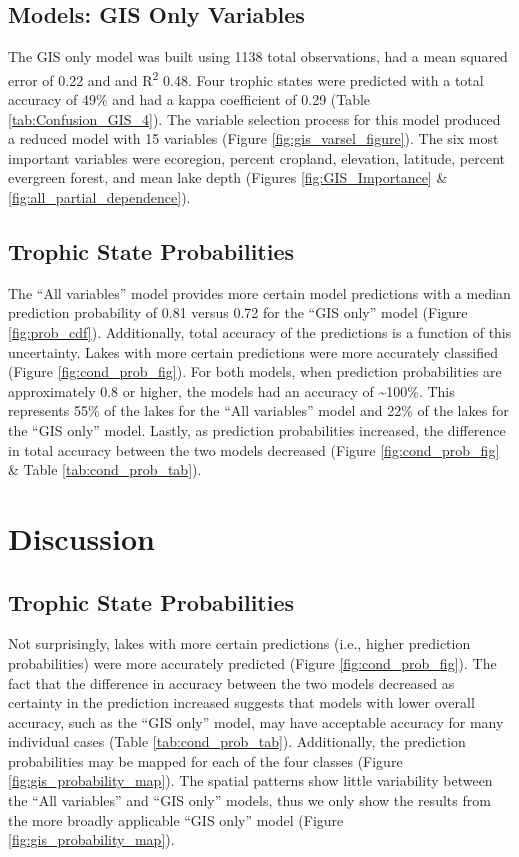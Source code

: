 \documentclass[12pt,]{article}
\begin{document}
\subsection{Models: GIS Only Variables}\label{models-gis-only-variables}

The GIS only model was built using 1138 total observations, had a mean
squared error of 0.22 and and R\textsuperscript{2} 0.48. Four trophic
states were predicted with a total accuracy of 49\% and had a kappa
coefficient of 0.29 (Table \ref{tab:Confusion_GIS_4}). The variable
selection process for this model produced a reduced model with 15
variables (Figure \ref{fig:gis_varsel_figure}). The six most important
variables were ecoregion, percent cropland, elevation, latitude, percent
evergreen forest, and mean lake depth (Figures \ref{fig:GIS_Importance}
\& \ref{fig:all_partial_dependence}).

\subsection{Trophic State
Probabilities}\label{trophic-state-probabilities-1}

The ``All variables'' model provides more certain model predictions with
a median prediction probability of 0.81 versus 0.72 for the ``GIS only''
model (Figure \ref{fig:prob_cdf}). Additionally, total accuracy of the
predictions is a function of this uncertainty. Lakes with more certain
predictions were more accurately classified (Figure
\ref{fig:cond_prob_fig}). For both models, when prediction probabilities
are approximately 0.8 or higher, the models had an accuracy of
\textasciitilde{}100\%. This represents 55\% of the lakes for the ``All
variables'' model and 22\% of the lakes for the ``GIS only'' model.
Lastly, as prediction probabilities increased, the difference in total
accuracy between the two models decreased (Figure
\ref{fig:cond_prob_fig} \& Table \ref{tab:cond_prob_tab}).

\section{Discussion}\label{discussion}

\subsection{Trophic State
Probabilities}\label{trophic-state-probabilities-2}

Not surprisingly, lakes with more certain predictions (i.e., higher
prediction probabilities) were more accurately predicted (Figure
\ref{fig:cond_prob_fig}). The fact that the difference in accuracy
between the two models decreased as certainty in the prediction
increased suggests that models with lower overall accuracy, such as the
``GIS only'' model, may have acceptable accuracy for many individual
cases (Table \ref{tab:cond_prob_tab}). Additionally, the prediction
probabilities may be mapped for each of the four classes (Figure
\ref{fig:gis_probability_map}). The spatial patterns show little
variability between the ``All variables'' and ``GIS only'' models, thus
we only show the results from the more broadly applicable ``GIS only''
model (Figure \ref{fig:gis_probability_map}).
\end{document}
